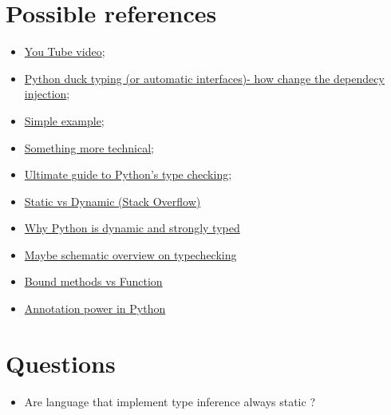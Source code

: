 \documentclass[12pt]{article}
\begin{document}
\maketitle
\tableofcontents
\listoftables
\listoffigures

\section{Possible references}
	\begin{itemize}
		\item \href{https://www.youtube.com/watch?v=fK5lcaNqdj4}{You Tube video};
		\item \href{https://hackernoon.com/python-duck-typing-or-automatic-interfaces-73988ec9037f}{Python duck typing (or automatic interfaces)- how change the dependecy injection};
		\item \href{https://medium.com/programming-hacks/duck-typing-in-python-6740aa72b301}{Simple example};
		\item \href{http://www.voidspace.org.uk/python/articles/duck_typing.shtml}{Something more technical};
		\item 
		\href{https://realpython.com/python-type-checking/}{Ultimate guide to Python's type checking;}
		\item
		\href{https://stackoverflow.com/questions/1517582/what-is-the-difference-between-statically-typed-and-dynamically-typed-languages}{Static vs Dynamic (Stack Overflow)}
		\item
		\href{https://wiki.python.org/moin/Why is Python a dynamic language and also a strongly typed language}{Why Python is dynamic and strongly typed}
		\item
		\href{https://android.jlelse.eu/magic-lies-here-statically-typed-vs-dynamically-typed-languages-d151c7f95e2b}{Maybe schematic overview on typechecking}
		\item
		\href{https://stackoverflow.com/questions/972/adding-a-method-to-an-existing-object-instance}{Bound methods vs Function}
		\item
		\href{https://stackoverflow.com/questions/41692473/does-python-type-hint-annotations-cause-some-run-time-effects}{Annotation power in Python}
	\end{itemize}

\section{Questions}
	\begin{itemize}
		\item Are language that implement type inference always static ?
	\end{itemize}
\newpage
\end{document}
